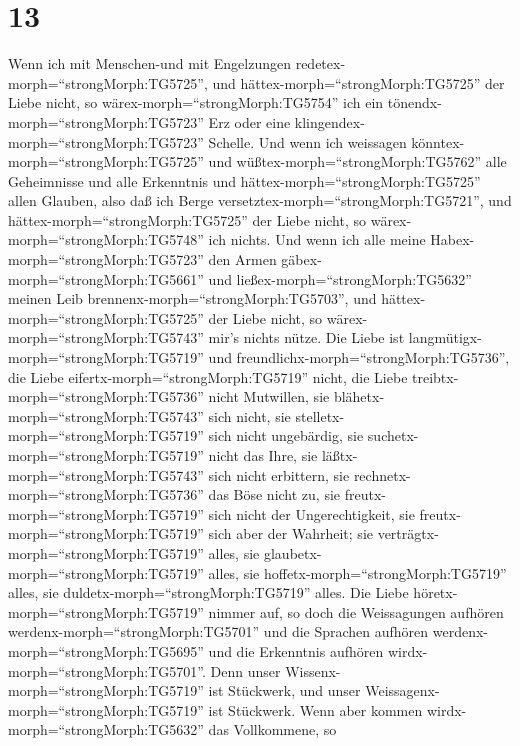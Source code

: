 \hypertarget{section-12}{%
\section{13}\label{section-12}}

 Wenn ich mit Menschen-und mit Engelzungen
redetex-morph=``strongMorph:TG5725'', und
hättex-morph=``strongMorph:TG5725'' der Liebe nicht, so
wärex-morph=``strongMorph:TG5754'' ich ein
tönendx-morph=``strongMorph:TG5723'' Erz oder eine
klingendex-morph=``strongMorph:TG5723'' Schelle.  Und wenn
ich weissagen könntex-morph=``strongMorph:TG5725'' und
wüßtex-morph=``strongMorph:TG5762'' alle Geheimnisse und alle Erkenntnis
und hättex-morph=``strongMorph:TG5725'' allen Glauben, also daß ich
Berge versetztex-morph=``strongMorph:TG5721'', und
hättex-morph=``strongMorph:TG5725'' der Liebe nicht, so
wärex-morph=``strongMorph:TG5748'' ich nichts.  Und wenn ich
alle meine Habex-morph=``strongMorph:TG5723'' den Armen
gäbex-morph=``strongMorph:TG5661'' und
ließex-morph=``strongMorph:TG5632'' meinen Leib
brennenx-morph=``strongMorph:TG5703'', und
hättex-morph=``strongMorph:TG5725'' der Liebe nicht, so
wärex-morph=``strongMorph:TG5743'' mir's nichts nütze.  Die
Liebe ist langmütigx-morph=``strongMorph:TG5719'' und
freundlichx-morph=``strongMorph:TG5736'', die Liebe
eifertx-morph=``strongMorph:TG5719'' nicht, die Liebe
treibtx-morph=``strongMorph:TG5736'' nicht Mutwillen, sie
blähetx-morph=``strongMorph:TG5743'' sich nicht,  sie
stelletx-morph=``strongMorph:TG5719'' sich nicht ungebärdig, sie
suchetx-morph=``strongMorph:TG5719'' nicht das Ihre, sie
läßtx-morph=``strongMorph:TG5743'' sich nicht erbittern, sie
rechnetx-morph=``strongMorph:TG5736'' das Böse nicht zu, 
sie freutx-morph=``strongMorph:TG5719'' sich nicht der Ungerechtigkeit,
sie freutx-morph=``strongMorph:TG5719'' sich aber der Wahrheit;
 sie verträgtx-morph=``strongMorph:TG5719'' alles, sie
glaubetx-morph=``strongMorph:TG5719'' alles, sie
hoffetx-morph=``strongMorph:TG5719'' alles, sie
duldetx-morph=``strongMorph:TG5719'' alles.  Die Liebe
höretx-morph=``strongMorph:TG5719'' nimmer auf, so doch die Weissagungen
aufhören werdenx-morph=``strongMorph:TG5701'' und die Sprachen aufhören
werdenx-morph=``strongMorph:TG5695'' und die Erkenntnis aufhören
wirdx-morph=``strongMorph:TG5701''.  Denn unser
Wissenx-morph=``strongMorph:TG5719'' ist Stückwerk, und unser
Weissagenx-morph=``strongMorph:TG5719'' ist Stückwerk. 
Wenn aber kommen wirdx-morph=``strongMorph:TG5632'' das Vollkommene, so
